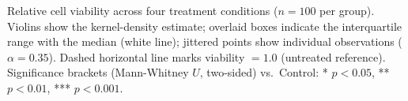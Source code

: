 \caption{Relative cell viability across four treatment conditions ($n=100$ per group).
Violins show the kernel-density estimate; overlaid boxes indicate the interquartile range with
the median (white line); jittered points show individual observations ($\alpha=0.35$).
Dashed horizontal line marks viability $= 1.0$ (untreated reference).
Significance brackets (Mann-Whitney $U$, two-sided) vs.\ Control: * $p<0.05$, ** $p<0.01$, *** $p<0.001$.}
